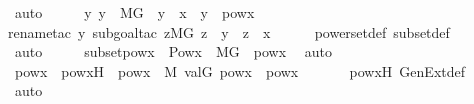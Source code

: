 \begin{isabellebody}
\ auto\isanewline
\ \ \isamarkupfalse%
\ \isamarkupfalse%
\ {\isachardoublequoteopen}{\isasymAnd}y{\isachardot}{\kern0pt}\ y\ {\isasymin}\ M{\isacharbrackleft}{\kern0pt}G{\isacharbrackright}{\kern0pt}\ {\isasymLongrightarrow}\ y\ {\isasymsubseteq}\ x\ {\isasymLongrightarrow}\ y\ {\isasymin}\ powx{\isachardoublequoteclose}\ \isanewline
\ \ \ \ \isamarkupfalse%
{\isacharparenleft}{\kern0pt}rename{\isacharunderscore}{\kern0pt}tac\ y{\isacharcomma}{\kern0pt}\ subgoal{\isacharunderscore}{\kern0pt}tac\ {\isachardoublequoteopen}{\isacharparenleft}{\kern0pt}{\isasymforall}z{\isacharbrackleft}{\kern0pt}{\isacharhash}{\kern0pt}{\isacharhash}{\kern0pt}M{\isacharbrackleft}{\kern0pt}G{\isacharbrackright}{\kern0pt}{\isacharbrackright}{\kern0pt}{\isachardot}{\kern0pt}\ z\ {\isasymin}\ y\ {\isasymlongrightarrow}\ z\ {\isasymin}\ x{\isacharparenright}{\kern0pt}{\isachardoublequoteclose}{\isacharparenright}{\kern0pt}\isanewline
\ \ \ \ \isamarkupfalse%
\ powerset{\isacharunderscore}{\kern0pt}def\ subset{\isacharunderscore}{\kern0pt}def\ \isanewline
\ \ \ \ \isamarkupfalse%
\ auto\isanewline
\ \ \isamarkupfalse%
\ \isamarkupfalse%
\ subsetpowx\ {\isacharcolon}{\kern0pt}\ {\isachardoublequoteopen}Pow{\isacharparenleft}{\kern0pt}x{\isacharparenright}{\kern0pt}\ {\isasyminter}\ M{\isacharbrackleft}{\kern0pt}G{\isacharbrackright}{\kern0pt}\ {\isasymsubseteq}\ powx{\isachardoublequoteclose}\ \isamarkupfalse%
\ auto\isanewline
\isanewline
\ \ \isamarkupfalse%
\ powx{\isacharprime}{\kern0pt}\ \ powx{\isacharprime}{\kern0pt}H\ {\isacharcolon}{\kern0pt}\ {\isachardoublequoteopen}powx{\isacharprime}{\kern0pt}\ {\isasymin}\ M{\isachardoublequoteclose}\ {\isachardoublequoteopen}val{\isacharparenleft}{\kern0pt}G{\isacharcomma}{\kern0pt}\ powx{\isacharprime}{\kern0pt}{\isacharparenright}{\kern0pt}\ {\isacharequal}{\kern0pt}\ powx{\isachardoublequoteclose}\ \isanewline
\ \ \ \ \isamarkupfalse%
\ powxH\ GenExt{\isacharunderscore}{\kern0pt}def\ \isanewline
\ \ \ \ \isamarkupfalse%
\ auto\isanewline
\isanewline
\ \ \isamarkupfalse%

\end{isabellebody}
